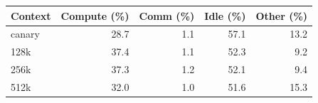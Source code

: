 \begin{tabular}{lrrrr}
\toprule
Context & Compute (\%) & Comm (\%) & Idle (\%) & Other (\%) \\
\midrule
canary & 28.7 & 1.1 & 57.1 & 13.2 \\
128k & 37.4 & 1.1 & 52.3 & 9.2 \\
256k & 37.3 & 1.2 & 52.1 & 9.4 \\
512k & 32.0 & 1.0 & 51.6 & 15.3 \\
\bottomrule
\end{tabular}
